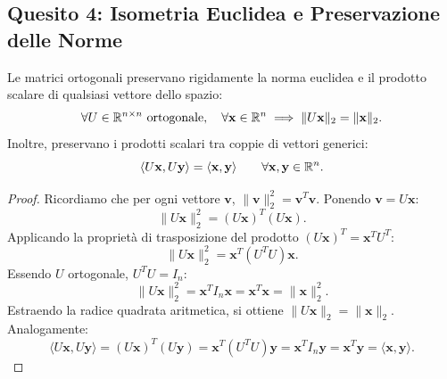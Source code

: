 \subsection{Quesito 4: Isometria Euclidea e Preservazione delle Norme}

\begin{theorem}
\label{thm:isometria-ortogonale}
Le matrici ortogonali preservano rigidamente la norma euclidea e il prodotto scalare di qualsiasi vettore dello spazio:
\begin{equation}
    \forall U \in \mathbb{R}^{n \times n} \text{ ortogonale}, \quad \forall \mathbf{x} \in \mathbb{R}^n \implies \|U\mathbf{x}\|_2 = \|\mathbf{x}\|_2.
\end{equation}
Inoltre, preservano i prodotti scalari tra coppie di vettori generici:
\begin{equation}
    \langle U\mathbf{x}, U\mathbf{y} \rangle = \langle \mathbf{x}, \mathbf{y} \rangle \qquad \forall \mathbf{x}, \mathbf{y} \in \mathbb{R}^n.
\end{equation}
\end{theorem}

\begin{proof}
Ricordiamo che per ogni vettore $\mathbf{v}$, $\|\mathbf{v}\|_2^2 = \mathbf{v}^T \mathbf{v}$. Ponendo $\mathbf{v} = U\mathbf{x}$:
\begin{equation}
    \|U\mathbf{x}\|_2^2 = (U\mathbf{x})^T (U\mathbf{x}).
\end{equation}
Applicando la propriet\`a di trasposizione del prodotto $(U\mathbf{x})^T = \mathbf{x}^T U^T$:
\begin{equation}
    \|U\mathbf{x}\|_2^2 = \mathbf{x}^T (U^T U) \mathbf{x}.
\end{equation}
Essendo $U$ ortogonale, $U^T U = I_n$:
\begin{equation}
    \|U\mathbf{x}\|_2^2 = \mathbf{x}^T I_n \mathbf{x} = \mathbf{x}^T \mathbf{x} = \|\mathbf{x}\|_2^2.
\end{equation}
Estraendo la radice quadrata aritmetica, si ottiene $\|U\mathbf{x}\|_2 = \|\mathbf{x}\|_2$. Analogamente:
\begin{equation}
    \langle U\mathbf{x}, U\mathbf{y} \rangle = (U\mathbf{x})^T (U\mathbf{y}) = \mathbf{x}^T (U^T U) \mathbf{y} = \mathbf{x}^T I_n \mathbf{y} = \mathbf{x}^T \mathbf{y} = \langle \mathbf{x}, \mathbf{y} \rangle.
\end{equation}
\end{proof}

